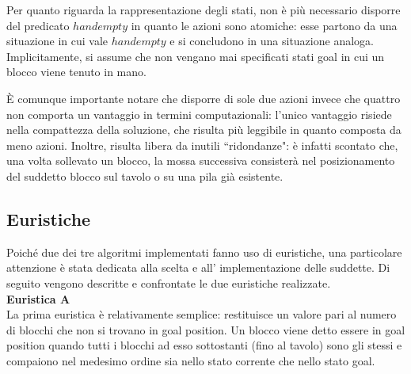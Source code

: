 Per quanto riguarda la rappresentazione degli stati, non è più necessario disporre del predicato $handempty$ in quanto le azioni sono atomiche: esse partono da una situazione in cui vale $handempty$ e si concludono in una situazione analoga. Implicitamente, si assume che non vengano mai specificati stati goal in cui un blocco viene tenuto in mano. 

È comunque importante notare che disporre di sole due azioni invece che quattro non comporta un vantaggio in termini computazionali: l'unico vantaggio risiede nella compattezza della soluzione, che risulta più leggibile in quanto composta da meno azioni. Inoltre, risulta libera da inutili ``ridondanze": è infatti scontato che, una volta sollevato un blocco, la mossa successiva consisterà nel posizionamento del suddetto blocco sul tavolo o su una pila già esistente.

\subsection{Euristiche}
Poiché due dei tre algoritmi implementati fanno uso di euristiche, una particolare attenzione è stata dedicata alla scelta e all' implementazione delle suddette. Di seguito vengono descritte e confrontate le due euristiche realizzate.\\

\noindent\textbf{Euristica A}\\
La prima euristica è relativamente semplice: restituisce un valore pari al numero di blocchi che non si trovano in goal position. Un blocco viene detto essere in goal position quando tutti i blocchi ad esso sottostanti (fino al tavolo) sono gli stessi e compaiono nel medesimo ordine sia nello stato corrente che nello stato goal. \\


